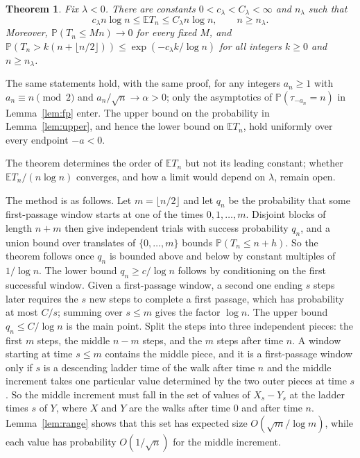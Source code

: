 \documentclass[11pt]{amsart}
\newtheorem{theorem}{Theorem}[section]
\theoremstyle{remark}
\numberwithin{equation}{section}
\newcommand{\PP}{\mathbb{P}}
\newcommand{\EE}{\mathbb{E}}
\begin{document}
\begin{theorem}\label{thm:main}
Fix $\lambda<0$. There are constants $0<c_\lambda<C_\lambda<\infty$ and $n_\lambda$ such that
\begin{equation}\label{eq:main}
c_\lambda n\log n\le\EE T_n\le C_\lambda n\log n,\qquad n\ge n_\lambda.
\end{equation}
Moreover, $\PP(T_n\le Mn)\to0$ for every fixed $M$, and $\PP(T_n>k(n+\lfloor n/2\rfloor))\le\exp(-c_\lambda k/\log n)$ for all integers $k\ge0$ and $n\ge n_\lambda$.
\end{theorem}

The same statements hold, with the same proof, for any integers $a_n\ge1$ with $a_n\equiv n\pmod 2$ and $a_n/\sqrt n\to\alpha>0$; only the asymptotics of $\PP(\tau_{-a_n}=n)$ in Lemma~\ref{lem:fp} enter. The upper bound on the probability in Lemma~\ref{lem:upper}, and hence the lower bound on $\EE T_n$, hold uniformly over every endpoint $-a<0$.

The theorem determines the order of $\EE T_n$ but not its leading constant; whether $\EE T_n/(n\log n)$ converges, and how a limit would depend on $\lambda$, remain open.

The method is as follows. Let $m=\lfloor n/2\rfloor$ and let $q_n$ be the probability that some first-passage window starts at one of the times $0,1,\dots,m$. Disjoint blocks of length $n+m$ then give independent trials with success probability $q_n$, and a union bound over translates of $\{0,\dots,m\}$ bounds $\PP(T_n\le n+h)$. So the theorem follows once $q_n$ is bounded above and below by constant multiples of $1/\log n$. The lower bound $q_n\ge c/\log n$ follows by conditioning on the first successful window. Given a first-passage window, a second one ending $s$ steps later requires the $s$ new steps to complete a first passage, which has probability at most $C/s$; summing over $s\le m$ gives the factor $\log n$. The upper bound $q_n\le C/\log n$ is the main point. Split the steps into three independent pieces: the first $m$ steps, the middle $n-m$ steps, and the $m$ steps after time $n$. A window starting at time $s\le m$ contains the middle piece, and it is a first-passage window only if $s$ is a descending ladder time of the walk after time $n$ and the middle increment takes one particular value determined by the two outer pieces at time $s$. So the middle increment must fall in the set of values of $X_s-Y_s$ at the ladder times $s$ of $Y$, where $X$ and $Y$ are the walks after time $0$ and after time $n$. Lemma~\ref{lem:range} shows that this set has expected size $O(\sqrt m/\log m)$, while each value has probability $O(1/\sqrt n)$ for the middle increment.
\end{document}
